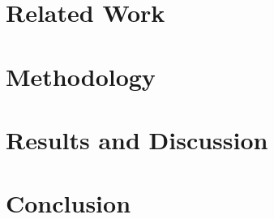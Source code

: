\documentclass{acmtog} %
\begin{document}
\section{Related Work}
\label{sec:relatedwork}
%


\section{Methodology}
\label{sec:methodology}
%

\section{Results and Discussion}
\label{sec:resultsanddiscussion}
%

\section{Conclusion}
\label{sec:conclusion}
%




\end{document}
